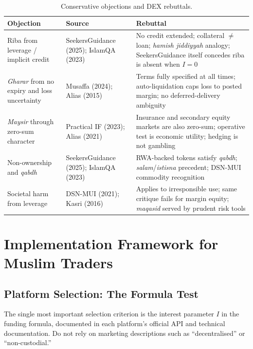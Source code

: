 \documentclass[10pt,twocolumn]{article}
\begin{document}
\begin{table}[htbp]
\centering
\caption{Conservative objections and DEX rebuttals.}
\label{tab:objections}
\small
\begin{tabular}{p{3.0cm}p{3.2cm}p{6.0cm}}
\toprule
\textbf{Objection} & \textbf{Source} & \textbf{Rebuttal} \\
\midrule
Riba from leverage / implicit credit &
SeekersGuidance (2025); IslamQA (2023) &
No credit extended; collateral $\neq$ loan; \textit{hamish jiddiyyah}
analogy; SeekersGuidance itself concedes riba is absent when $I=0$ \\[4pt]
\textit{Gharar} from no expiry and loss uncertainty &
Musaffa (2024); Alias (2015) &
Terms fully specified at all times; auto-liquidation caps loss to posted
margin; no deferred-delivery ambiguity \\[4pt]
\textit{Maysir} through zero-sum character &
Practical IF (2023); Alias (2021) &
Insurance and secondary equity markets are also zero-sum; operative test is
economic utility; hedging is not gambling \\[4pt]
Non-ownership and \textit{qabdh} &
SeekersGuidance (2025); IslamQA (2023) &
RWA-backed tokens satisfy \textit{qabdh}; \textit{salam}/\textit{istisna}
precedent; DSN-MUI commodity recognition \\[4pt]
Societal harm from leverage &
DSN-MUI (2021); Kasri (2016) &
Applies to irresponsible use; same critique fails for margin equity;
\textit{maqasid} served by prudent risk tools \\
\bottomrule
\end{tabular}
\end{table}

\section{Implementation Framework for Muslim Traders}
\label{sec:implementation}

\subsection{Platform Selection: The Formula Test}

The single most important selection criterion is the interest parameter $I$ in
the funding formula, documented in each platform's official API and technical
documentation. Do not rely on marketing descriptions such as ``decentralised''
or ``non-custodial.''
\end{document}
